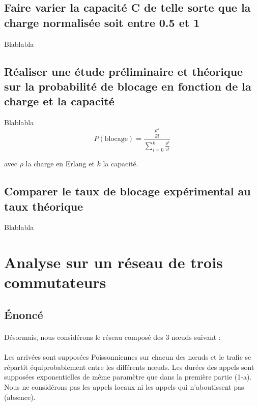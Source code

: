         \subsection{Faire varier la capacité C de telle sorte que la charge normalisée soit entre 0.5 et 1}
Blablabla
%
        \subsection{Réaliser une étude préliminaire et théorique sur la probabilité de blocage en fonction de la charge et la capacité}
Blablabla
\[ P(\text{blocage}) = \frac{ \frac{ \rho^k }{ k! } }{ \sum\limits_{i=0}^k \frac{ \rho^i }{ i! } } \]
            \begin{center}
                avec $\rho$ la charge en Erlang et $k$ la capacité.
            \end{center}
%
        \subsection{Comparer le taux de blocage expérimental au taux théorique}
Blablabla
%
    \clearpage
%
%
%
    \section{Analyse sur un réseau de trois commutateurs}
%
        \subsection{Énoncé}
%
            \paragraph{}
Désormais, nous considérons le réseau composé des 3 nœuds suivant :
%
            \paragraph{}
Les arrivées sont supposées Poissonniennes sur chacun des nœuds et le trafic se répartit équiprobablement entre les différents nœuds.
Les durées des appels sont supposées exponentielles de même paramètre que dans la première partie (1-a).
Nous ne considérons pas les appels locaux ni les appels qui n'aboutissent pas (absence).
%
